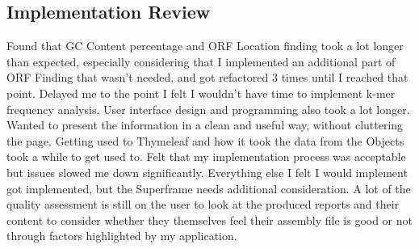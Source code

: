 \subsection{Implementation Review}
Found that GC Content percentage and ORF Location finding took a lot longer than expected, especially considering that I implemented an additional part of ORF Finding that wasn't needed, and got refactored 3 times until I reached that point. Delayed me to the point I felt I wouldn't have time to implement k-mer frequency analysis. 
User interface design and programming also took a lot longer. Wanted to present the information in a clean and useful way, without cluttering the page. Getting used to Thymeleaf and how it took the data from the Objects took a while to get used to. Felt that my implementation process was acceptable but issues slowed me down significantly. Everything else I felt I would implement got implemented, but the Superframe needs additional consideration. A lot of the quality assessment is still on the user to look at the produced reports and their content to consider whether they themselves feel their assembly file is good or not through factors highlighted by my application.




